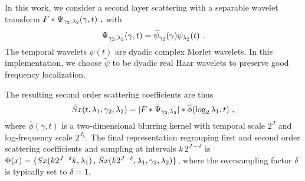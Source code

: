 In this work, we consider a second layer scattering with 
a separable wavelet transform $F \ast \Psi_{\gamma_2, {\lambda}_2} (\gamma, t)~,$
with
$$\Psi_{{\gamma_2}, {{\lambda}_2}}(\gamma,t) = \widetilde{\psi}_{\gamma_2}(\gamma) \psi_{{\lambda}_2}(t)~.$$
The temporal wavelets $\psi(t)$ are dyadic complex Morlet wavelets. 
In this implementation, 
we choose $\widetilde{\psi}$ to be dyadic real Haar wavelets to preserve good frequency localization.

The resulting second order scattering coefficients are thus
\[
\tilde{S} x (t, {\lambda}_1, \gamma_2,  {\lambda}_2) = 
 |F \ast \bar \Psi_{\gamma_2, {\lambda}_2} | \ast \overline{\phi}( \log_2 {\lambda}_1, t)~,
\]
where $\overline{\phi}(\gamma, t)$ is a two-dimensional blurring kernel with temporal 
scale $2^J$ and log-frequency scale $2^{J_h}$.
 The final representation regrouping first and second order scattering
coefficients and sampling at intervals $k\,2^{J-\delta}$
is $\Phi(x) = \{ Sx(k 2^{J-\delta} k,{\lambda}_1)\,,\, \tilde{S}x(k 2^{J-\delta} ,{\lambda}_1,\gamma_2, {\lambda}_2)\} $, 
where the oversampling factor $\delta$ is typically set to $\delta=1$.


%
%
%
%
%
%
